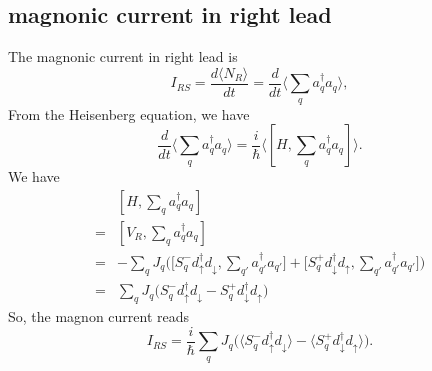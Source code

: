 \documentclass[11pt,a4paper]{book}
\begin{document}
\subsection{magnonic current in right lead}
The magnonic current in right lead is
\begin{equation}
I_{RS} = \frac{d\langle N_{R}\rangle}{dt} =  \frac{d}{dt} \langle \sum_{q}a_{q}^{\dag}a_{q}\rangle,
\end{equation}
From the Heisenberg equation, we have
\begin{equation}
\frac{d}{dt} \langle \sum_{q}a_{q}^{\dag}a_{q}\rangle = \frac{i}{\hbar} \langle [H, \sum_{q}a_{q}^{\dag}a_{q}] \rangle.
\end{equation}
We have
\begin{equation}
\begin{split}
&[H, \sum_{q}a_{q}^{\dag}a_{q}] \\
= &[V_{R}, \sum_{q}a_{q}^{\dag}a_{q}]\\
= &-\sum_{q} J_{q} \Big(\big[S_{q}^{-}d_{\uparrow}^{\dag}d_{\downarrow}, \sum_{q'}a_{q'}^{\dag}a_{q'}\big] + \big[S_{q}^{+}d_{\downarrow}^{\dag}d_{\uparrow}, \sum_{q'}a_{q'}^{\dag}a_{q'}\big]\Big) \\
= & \sum_{q} J_{q} \big( S_{q}^{-}d_{\uparrow}^{\dag}d_{\downarrow} - S_{q}^{+}d_{\downarrow}^{\dag}d_{\uparrow} \big)
\end{split}
\end{equation}
So, the magnon current reads
\begin{equation}
I_{RS} = \frac{i}{\hbar} \sum_{q} J_{q} \big( \big\langle S_{q}^{-}d_{\uparrow}^{\dag}d_{\downarrow}\big\rangle - \big\langle S_{q}^{+}d_{\downarrow}^{\dag}d_{\uparrow} \big\rangle \big) .
\end{equation}
\end{document}
